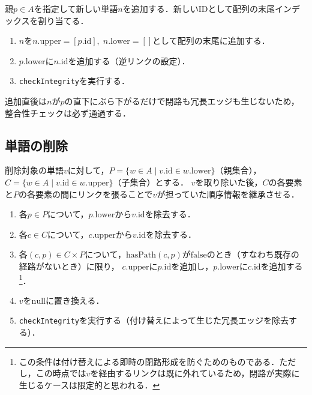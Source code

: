 \documentclass[../../main-detail.tex]{subfiles}
\begin{document}
\begin{definition}
    親$p \in A$を指定して新しい単語$n$を追加する．新しいIDとして配列の末尾インデックスを割り当てる．
    \begin{enumerate}
        \item $n$を$n.\mathrm{upper} = [p.\mathrm{id}],\; n.\mathrm{lower} = []$として配列の末尾に追加する．
        \item $p.\mathrm{lower}$に$n.\mathrm{id}$を追加する（逆リンクの設定）．
        \item \texttt{checkIntegrity}を実行する．
    \end{enumerate}
    追加直後は$n$が$p$の直下にぶら下がるだけで閉路も冗長エッジも生じないため，整合性チェックは必ず通過する．
\end{definition}

\subsection{単語の削除}

削除対象の単語$v$に対して，$P = \{w \in A \mid v.\mathrm{id} \in w.\mathrm{lower}\}$（親集合），$C = \{w \in A \mid v.\mathrm{id} \in w.\mathrm{upper}\}$（子集合）とする．
$v$を取り除いた後，$C$の各要素と$P$の各要素の間にリンクを張ることで$v$が担っていた順序情報を継承させる．

\begin{definition}
    \begin{enumerate}
        \item 各$p \in P$について，$p.\mathrm{lower}$から$v.\mathrm{id}$を除去する．
        \item 各$c \in C$について，$c.\mathrm{upper}$から$v.\mathrm{id}$を除去する．
        \item 各$(c, p) \in C \times P$について，$\mathrm{hasPath}(c, p)$が$\mathrm{false}$のとき（すなわち既存の経路がないとき）に限り，
              $c.\mathrm{upper}$に$p.\mathrm{id}$を追加し，$p.\mathrm{lower}$に$c.\mathrm{id}$を追加する
              \footnote{
                  この条件は付け替えによる即時の閉路形成を防ぐためのものである．ただし，この時点では$v$を経由するリンクは既に外れているため，閉路が実際に生じるケースは限定的と思われる．
              }．
        \item $v$を$\mathrm{null}$に置き換える．
        \item \texttt{checkIntegrity}を実行する（付け替えによって生じた冗長エッジを除去する）．
    \end{enumerate}
\end{definition}
\end{document}

